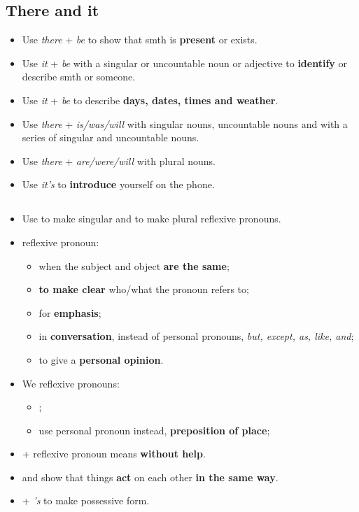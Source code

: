 \subsection{There and it}
\begin{itemize}
    \item Use \textit{there} + \textit{be} to show that smth is \textbf{present} or exists.
    \item Use \textit{it} + \textit{be} with a singular or uncountable noun or adjective
    to \textbf{identify} or describe smth or someone.
    \item Use \textit{it} + \textit{be} to describe \textbf{days, dates, times and weather}.
    \item Use \textit{there} + \textit{is/was/will} with singular nouns, uncountable nouns
    and with a series of singular and uncountable nouns.
    \item Use \textit{there} + \textit{are/were/will} with plural nouns.
    \item[\ast] Use \textit{it's} to \textbf{introduce} yourself on the phone.
\end{itemize}

\subsection{}
\begin{itemize}
    \item[\doot] Use  to make singular and  to make plural reflexive pronouns.
    \item[\doot]  reflexive pronoun:
    \begin{itemize}
        \item[\daash] when the subject and object \textbf{are the same};
        \item[\daash] \textbf{to make clear} who/what the pronoun refers to;
        \item[\daash] for \textbf{emphasis};
        \item[\daash] in \textbf{conversation}, instead of personal pronouns,
         \textit{but, except, as, like, and};
        \item[\daash]  to give a \textbf{personal opinion}.
    \end{itemize}
    \item[\doot] We  reflexive pronouns:
    \begin{itemize}
        \item[\daash]  ;
        \item[\daash] use personal pronoun instead,  \textbf{preposition of place};
    \end{itemize}
    \item[\doot]  + reflexive pronoun means \textbf{without help}.
    \item[\doot]  and  show
    that things \textbf{act} on each other \textbf{in the same way}.
    \item[\doot]  + \textit{'s} to make possessive form.
\end{itemize}